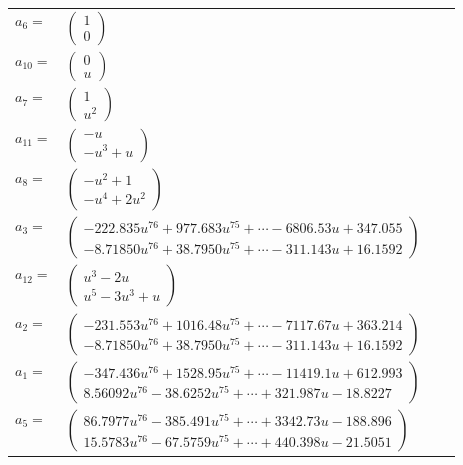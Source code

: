 \documentclass[1p]{elsarticle_modified}
\theoremstyle{definition}
\begin{document}
\begin{tabular}{m{7pt} m{180pt} m{7pt} m{180pt} }
\flushright $a_{6}=$&$\begin{pmatrix}1\\0\end{pmatrix}$ \\
\flushright $a_{10}=$&$\begin{pmatrix}0\\u\end{pmatrix}$ \\
\flushright $a_{7}=$&$\begin{pmatrix}1\\u^2\end{pmatrix}$ \\
\flushright $a_{11}=$&$\begin{pmatrix}- u\\- u^3+u\end{pmatrix}$ \\
\flushright $a_{8}=$&$\begin{pmatrix}- u^2+1\\- u^4+2 u^2\end{pmatrix}$ \\
\flushright $a_{3}=$&$\begin{pmatrix}-222.835 u^{76}+977.683 u^{75}+\cdots-6806.53 u+347.055\\-8.71850 u^{76}+38.7950 u^{75}+\cdots-311.143 u+16.1592\end{pmatrix}$ \\
\flushright $a_{12}=$&$\begin{pmatrix}u^3-2 u\\u^5-3 u^3+u\end{pmatrix}$ \\
\flushright $a_{2}=$&$\begin{pmatrix}-231.553 u^{76}+1016.48 u^{75}+\cdots-7117.67 u+363.214\\-8.71850 u^{76}+38.7950 u^{75}+\cdots-311.143 u+16.1592\end{pmatrix}$ \\
\flushright $a_{1}=$&$\begin{pmatrix}-347.436 u^{76}+1528.95 u^{75}+\cdots-11419.1 u+612.993\\8.56092 u^{76}-38.6252 u^{75}+\cdots+321.987 u-18.8227\end{pmatrix}$ \\
\flushright $a_{5}=$&$\begin{pmatrix}86.7977 u^{76}-385.491 u^{75}+\cdots+3342.73 u-188.896\\15.5783 u^{76}-67.5759 u^{75}+\cdots+440.398 u-21.5051\end{pmatrix}$ \\

\end{tabular}
\end{document}
